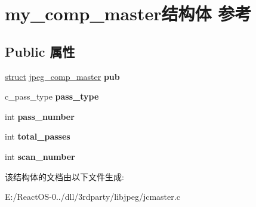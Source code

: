 \hypertarget{structmy__comp__master}{}\section{my\+\_\+comp\+\_\+master结构体 参考}
\label{structmy__comp__master}
\subsection*{Public 属性}
\begin{DoxyCompactItemize}
\item 
\mbox{\label{structmy__comp__master_a92f91e2f4b79fd0e6ae36f24d8f455f0}} 
\hyperlink{interfacestruct}{struct} \hyperlink{structjpeg__comp__master}{jpeg\+\_\+comp\+\_\+master} {\bfseries pub}
\item 
\mbox{\label{structmy__comp__master_ab153ff271327de71553b428d057e991b}} 
c\+\_\+pass\+\_\+type {\bfseries pass\+\_\+type}
\item 
\mbox{\label{structmy__comp__master_a08c52f446296c1890808382af30ae43d}} 
int {\bfseries pass\+\_\+number}
\item 
\mbox{\label{structmy__comp__master_abc21ff7e11e64247ad8ff68ad819e9fc}} 
int {\bfseries total\+\_\+passes}
\item 
\mbox{\label{structmy__comp__master_a85aabce3d888eccfaf21eeb8c5cc8606}} 
int {\bfseries scan\+\_\+number}
\end{DoxyCompactItemize}


该结构体的文档由以下文件生成\+:\begin{DoxyCompactItemize}
\item 
E\+:/\+React\+O\+S-\/0../dll/3rdparty/libjpeg/jcmaster.\+c\end{DoxyCompactItemize}

